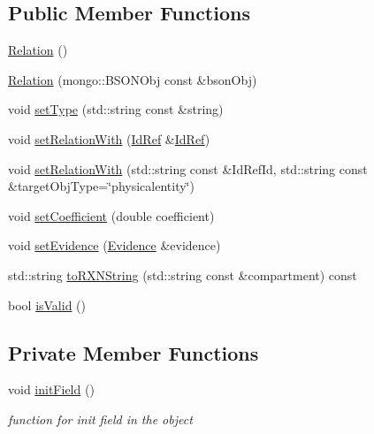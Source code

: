 \subsection*{Public Member Functions}
\begin{DoxyCompactItemize}
\item 
\hyperlink{classunisys_1_1Relation_a7c9ac1aa53c405470dd58d707b93d2e0}{Relation} ()
\item 
\hyperlink{classunisys_1_1Relation_ac7791ff194a3c58e8e8164b9c013df6a}{Relation} (mongo\-::\-B\-S\-O\-N\-Obj const \&bson\-Obj)
\item 
void \hyperlink{classunisys_1_1Relation_ac1876058f3a544e40b567750f3737570}{set\-Type} (std\-::string const \&string)
\item 
void \hyperlink{classunisys_1_1Relation_a389133d7ae3062fcc79c78aa90b64e2b}{set\-Relation\-With} (\hyperlink{classunisys_1_1IdRef}{Id\-Ref} \&\hyperlink{classunisys_1_1IdRef}{Id\-Ref})
\item 
void \hyperlink{classunisys_1_1Relation_afd179cc8bde372ef4e52c80a382fbb20}{set\-Relation\-With} (std\-::string const \&Id\-Ref\-Id, std\-::string const \&target\-Obj\-Type=\char`\"{}physicalentity\char`\"{})
\item 
void \hyperlink{classunisys_1_1Relation_a920d95e9c1d85bceaed69c22d3eff4e1}{set\-Coefficient} (double coefficient)
\item 
void \hyperlink{classunisys_1_1Relation_af44e7c08aeaccaa4c73a8e68757c0c01}{set\-Evidence} (\hyperlink{classunisys_1_1Evidence}{Evidence} \&evidence)
\item 
std\-::string \hyperlink{classunisys_1_1Relation_af165c04680b41c48ebc792e6cf5e7893}{to\-R\-X\-N\-String} (std\-::string const \&compartment) const 
\item 
bool \hyperlink{classunisys_1_1Relation_a45b8b2e7c70084c00749031cb450bf7a}{is\-Valid} ()
\end{DoxyCompactItemize}
\subsection*{Private Member Functions}
\begin{DoxyCompactItemize}
\item 
void \hyperlink{classunisys_1_1Relation_a2793345e5ca711cf0f6f8229a4c652ab}{init\-Field} ()
\begin{DoxyCompactList}\small\item\em function for init field in the object \end{DoxyCompactList}\end{DoxyCompactItemize}
